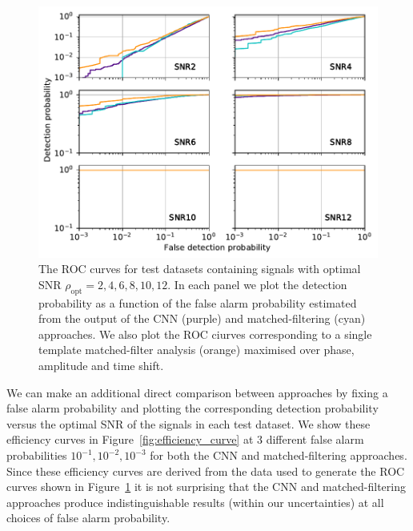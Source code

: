 \documentclass[%
showpacs,
 amsmath,amssymb,
 aps,
 twocolumn,
 prl,
 reprint,
floatfix,
]{revtex4-1}
\newcommand{\chris}[1]{\textbf{\textcolor{green}{CHRIS: #1}}}
\begin{document}
%
%
\begin{figure}[]
\includegraphics[width=\columnwidth] {figures/ROC_curves.pdf}
\caption{The \ac{ROC} curves for test datasets containing signals with optimal
SNR $\rho_{\mathrm{opt}}=2,4,6,8,10,12$.  In each panel we plot the detection
probability as a function of the false alarm probability estimated from the
output of the \ac{CNN} (purple) and matched-filtering (cyan) approaches. We also
plot the \ac{ROC} ciurves corresponding to a single template matched-filter
analysis (orange) maximised over phase, amplitude and time shift.
\label{fig:ROC_curves}}
\end{figure}

%
%
We can make an additional direct comparison between approaches by fixing a
false alarm probability and plotting the corresponding detection probability
versus the optimal SNR of the signals in each test dataset. We show these
efficiency curves in Figure~\ref{fig:efficiency_curve} at 3 different false alarm
probabilities $10^{-1},10^{-2},10^{-3}$ for both the \ac{CNN} and
matched-filtering approaches. Since these efficiency curves are derived from
the data used to generate the \ac{ROC} curves shown in
Figure~\ref{fig:ROC_curves} it is not surprising that the \ac{CNN} and
matched-filtering approaches produce indistinguishable results (within our
uncertainties) at all choices of false alarm probability.
\end{document}
